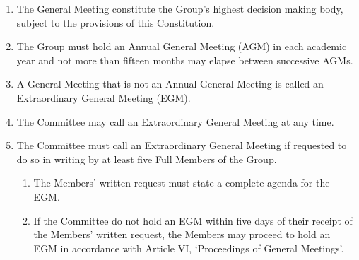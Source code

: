 \documentclass[12pt]{constitution}
\begin{document}

\begin{enumerate}
    \item The General Meeting constitute the Group's highest decision ­making body, subject to the provisions of this Constitution.
    \item The Group must hold an Annual General Meeting (AGM) in each academic year and not more than fifteen months may elapse between successive AGMs.
    \item A General Meeting that is not an Annual General Meeting is called an Extraordinary General Meeting (EGM).
    \item The Committee may call an Extraordinary General Meeting at any time.
    \item The Committee must call an Extraordinary General Meeting if requested to do so in writing by at least five Full Members of the Group.
    \begin{enumerate}
        \item The Members' written request must state a complete agenda for the EGM.
        \item If the Committee do not hold an EGM within five days of their receipt of the Members' written request, the Members may proceed to hold an EGM in accordance with Article VI, `Proceedings of General Meetings'.
    \end{enumerate}
\end{enumerate}


\end{document}
